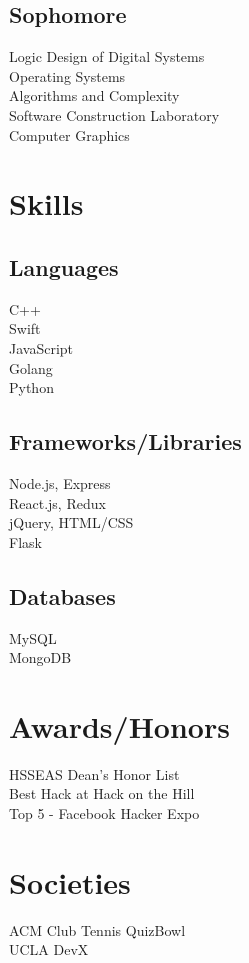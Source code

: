 \documentclass[]{deedy-resume-openfont}
\begin{document}
\begin{minipage}[t]{0.33\textwidth}
\subsection{Sophomore}
Logic Design of Digital Systems \\
Operating Systems \\
Algorithms and Complexity \\
Software Construction Laboratory \\
Computer Graphics \\
\sectionsep


\section{Skills}
\subsection{Languages}
\textbullet{} C++  \\
\textbullet{} Swift \\
\textbullet{} JavaScript \\
\textbullet{} Golang \\
\textbullet{} Python \\
\sectionsep
\subsection{Frameworks/Libraries}
\textbullet{} Node.js, Express  \\
\textbullet{} React.js, Redux \\
\textbullet{} jQuery, HTML/CSS \\
\textbullet{} Flask \\
\sectionsep
\subsection{Databases}
\textbullet{} MySQL \\
\textbullet{} MongoDB


\sectionsep

\section{Awards/Honors}
\textbullet{} HSSEAS Dean's Honor List \\
\textbullet{} Best Hack at Hack on the Hill\\
\textbullet{} Top 5 - Facebook Hacker Expo\\

\sectionsep

\section{Societies}
ACM \textbullet{} Club Tennis \textbullet{} QuizBowl \textbullet{} \\ UCLA DevX

%
%

\end{minipage}
\end{document}
